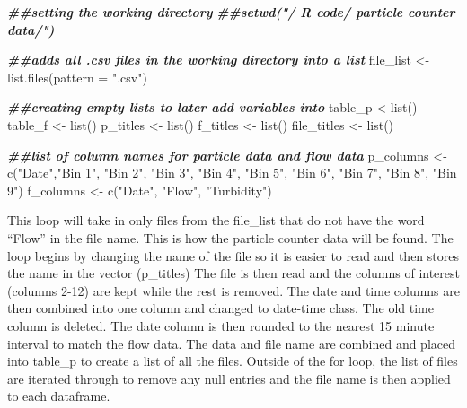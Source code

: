 \documentclass[
]{article}
\newenvironment{Shaded}{\begin{snugshade}}{\end{snugshade}}
\newcommand{\AttributeTok}[1]{\textcolor[rgb]{0.77,0.63,0.00}{#1}}
\newcommand{\DocumentationTok}[1]{\textcolor[rgb]{0.56,0.35,0.01}{\textbf{\textit{#1}}}}
\newcommand{\FunctionTok}[1]{\textcolor[rgb]{0.00,0.00,0.00}{#1}}
\newcommand{\NormalTok}[1]{#1}
\newcommand{\OtherTok}[1]{\textcolor[rgb]{0.56,0.35,0.01}{#1}}
\newcommand{\StringTok}[1]{\textcolor[rgb]{0.31,0.60,0.02}{#1}}
\begin{document}
\begin{Shaded}
\begin{Highlighting}[]
\DocumentationTok{\#\#setting the working directory}
\DocumentationTok{\#\#setwd("\textasciigrave{}/ R code/ particle counter data/")}

\DocumentationTok{\#\#adds all .csv files in the working directory into a list}
\NormalTok{file\_list }\OtherTok{\textless{}{-}} \FunctionTok{list.files}\NormalTok{(}\AttributeTok{pattern =} \StringTok{".csv"}\NormalTok{)}

\DocumentationTok{\#\#creating empty lists to later add variables into}
\NormalTok{table\_p }\OtherTok{\textless{}{-}}\FunctionTok{list}\NormalTok{()}
\NormalTok{table\_f }\OtherTok{\textless{}{-}} \FunctionTok{list}\NormalTok{()}
\NormalTok{p\_titles }\OtherTok{\textless{}{-}} \FunctionTok{list}\NormalTok{()}
\NormalTok{f\_titles }\OtherTok{\textless{}{-}} \FunctionTok{list}\NormalTok{()}
\NormalTok{file\_titles }\OtherTok{\textless{}{-}} \FunctionTok{list}\NormalTok{()}

\DocumentationTok{\#\#list of column names for particle data and flow data}
\NormalTok{p\_columns }\OtherTok{\textless{}{-}} \FunctionTok{c}\NormalTok{(}\StringTok{"Date"}\NormalTok{,}\StringTok{"Bin 1"}\NormalTok{, }\StringTok{"Bin 2"}\NormalTok{, }\StringTok{"Bin 3"}\NormalTok{, }\StringTok{"Bin 4"}\NormalTok{, }\StringTok{"Bin 5"}\NormalTok{, }\StringTok{"Bin 6"}\NormalTok{, }\StringTok{"Bin 7"}\NormalTok{, }\StringTok{"Bin 8"}\NormalTok{, }\StringTok{"Bin 9"}\NormalTok{)}
\NormalTok{f\_columns }\OtherTok{\textless{}{-}} \FunctionTok{c}\NormalTok{(}\StringTok{"Date"}\NormalTok{, }\StringTok{"Flow"}\NormalTok{, }\StringTok{"Turbidity"}\NormalTok{)}
\end{Highlighting}
\end{Shaded}

This loop will take in only files from the file\_list that do not have
the word ``Flow'' in the file name. This is how the particle counter
data will be found. The loop begins by changing the name of the file so
it is easier to read and then stores the name in the vector (p\_titles)
The file is then read and the columns of interest (columns 2-12) are
kept while the rest is removed. The date and time columns are then
combined into one column and changed to date-time class. The old time
column is deleted. The date column is then rounded to the nearest 15
minute interval to match the flow data. The data and file name are
combined and placed into table\_p to create a list of all the files.
Outside of the for loop, the list of files are iterated through to
remove any null entries and the file name is then applied to each
dataframe.
\end{document}
